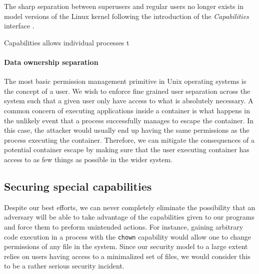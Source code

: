 
The sharp separation between superusers and regular users no longer
exists in model versions of the Linux kernel following the
introduction of the \textit{Capabilities} interface \cite{cap7}. 

Capabilities allows individual processes t

\paragraph{Data ownership separation}
The most basic permission management primitive in Unix operating
systems is the concept of a user. We wish to enforce fine grained user
separation across the system such that a given user only have access
to what is absolutely necessary. A common concern of executing
applications inside a container is what happens in the unlikely event
that a process successfully manages to escape the container. In this
case, the attacker would usually end up having the same permissions as
the process executing the container. Therefore, we can mitigate the
consequences of a potential container escape by making sure that the
user executing container has access to as few things as possible in
the wider system.


\subsection{Securing special capabilities}
Despite our best efforts, we can never completely eliminate the
possibility that an adversary will be able to take advantage of the
capabilities given to our programs and force them to preform
unintended actions. For instance, gaining arbitrary code execution in
a process with the \texttt{chown} capability would allow one to change
permissions of any file in the system. Since our security model to a
large extent relies on users having access to a minimalized set of
files, we would consider this to be a rather serious security
incident.

